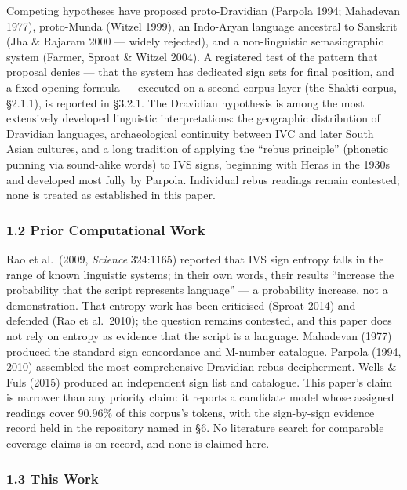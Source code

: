 \documentclass[
]{article}
\newcounter{none} %
\begin{document}
Competing hypotheses have proposed proto-Dravidian (Parpola 1994;
Mahadevan 1977), proto-Munda (Witzel 1999), an Indo-Aryan language
ancestral to Sanskrit (Jha \& Rajaram 2000 --- widely rejected), and a
non-linguistic semasiographic system (Farmer, Sproat \& Witzel 2004). A registered test of the pattern that proposal denies --- that the system has dedicated sign sets for final position, and a fixed opening formula --- executed on a second corpus layer (the Shakti corpus, §2.1.1), is reported in §3.2.1.
The Dravidian hypothesis is among the most extensively developed linguistic interpretations: the
geographic distribution of Dravidian languages, archaeological
continuity between IVC and later South Asian cultures, and a long tradition of applying the ``rebus principle'' (phonetic punning via sound-alike words) to IVS signs, beginning with Heras in the 1930s and developed most fully by Parpola. Individual rebus readings remain contested; none is treated as established in this paper.

\subsubsection{1.2 Prior Computational
Work}\label{prior-computational-work}

Rao et al.~(2009, \emph{Science} 324:1165) reported that IVS sign entropy falls in the range of known linguistic systems; in their own words, their results ``increase the probability that the script represents language'' --- a probability increase, not a demonstration. That entropy work has been criticised (Sproat 2014) and defended (Rao et al.~2010); the question remains contested, and this paper does not rely on entropy as evidence that the script is a language.
Mahadevan (1977) produced the standard sign concordance and M-number
catalogue. Parpola (1994, 2010) assembled the most comprehensive
Dravidian rebus decipherment. Wells \& Fuls (2015) produced an independent sign
list and catalogue. This paper's claim is narrower than any priority claim: it reports a candidate model whose assigned readings cover 90.96\% of this corpus's tokens, with the sign-by-sign evidence record held in the repository named in §6. No literature search for comparable coverage claims is on record, and none is claimed here.

\subsubsection{1.3 This Work}\label{this-work}
\end{document}
